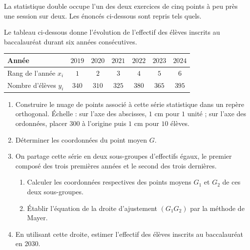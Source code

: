 \begin{annales}
La statistique double occupe l'un des deux exercices de cinq points à peu
près une session sur deux. Les énoncés ci-dessous sont repris tels quels.

Le tableau ci-dessous donne l'évolution de l'effectif des élèves inscrits au
baccalauréat durant six années consécutives.

\begin{center}\footnotesize
\renewcommand{\arraystretch}{1.25}
\begin{tabular}{|l|c|c|c|c|c|c|}
\hline
Année & $2019$ & $2020$ & $2021$ & $2022$ & $2023$ & $2024$\\
\hline
Rang de l'année $x_{i}$ & $1$ & $2$ & $3$ & $4$ & $5$ & $6$\\
\hline
Nombre d'élèves $y_{i}$ & $340$ & $310$ & $325$ & $380$ & $365$ & $395$\\
\hline
\end{tabular}
\end{center}

\begin{enumerate}[label=\textbf{\arabic*)}, leftmargin=*, itemsep=0.15em]
  \item Construire le nuage de points associé à cette série statistique dans
        un repère orthogonal. Échelle : sur l'axe des abscisses, $1$ cm pour
        $1$ unité ; sur l'axe des ordonnées, placer $300$ à l'origine puis
        $1$ cm pour $10$ élèves.
  \item Déterminer les coordonnées du point moyen $G$.
  \item On partage cette série en deux sous-groupes d'effectifs égaux, le
        premier composé des trois premières années et le second des trois
        dernières.
        \begin{enumerate}[label=\textbf{\alph*)}, leftmargin=1.4em]
          \item Calculer les coordonnées respectives des points moyens
                $G_{1}$ et $G_{2}$ de ces deux sous-groupes.
          \item Établir l'équation de la droite d'ajustement
                $\left(G_{1}G_{2}\right)$ par la méthode de Mayer.
        \end{enumerate}
  \item En utilisant cette droite, estimer l'effectif des élèves inscrits au
        baccalauréat en $2030$.
\end{enumerate}


\end{annales}
